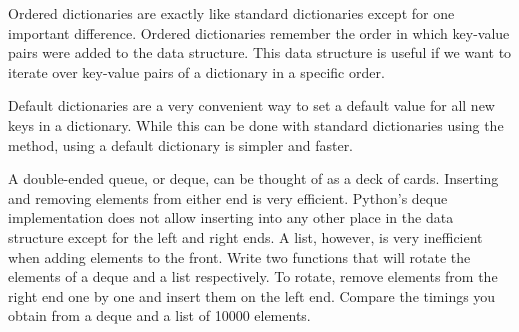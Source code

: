Ordered dictionaries are exactly like standard dictionaries except for one important
difference.  Ordered dictionaries remember the order in which key-value pairs were added
to the data structure.  This data structure is useful if we want to iterate over key-value pairs
of a dictionary in a specific order.

Default dictionaries are a very convenient way to set a default value for all new keys in a dictionary.  While this can be done with standard dictionaries using the  method,
using a default dictionary is simpler and faster.

\begin{problem}
A double-ended queue, or deque, can be thought of as a deck of cards.
Inserting and removing elements from either end is very efficient.
Python's deque implementation does not allow inserting into any other place
in the data structure except for the left and right ends.
A list, however, is very inefficient when adding elements to the front.
Write two functions that will rotate the elements of a deque and a list respectively.
To rotate, remove elements from the right end one by one and insert them on the left end.
Compare the timings you obtain from a deque and a list of 10000 elements.
\end{problem}
